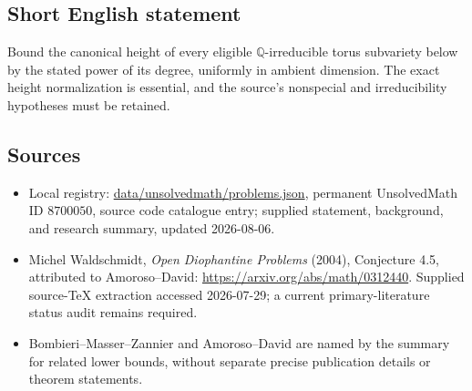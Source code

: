 \documentclass[11pt]{article}
\begin{document}
\subsection{Short English statement}
Bound the canonical height of every eligible \(\mathbb Q\)-irreducible torus subvariety below by the stated power of its degree, uniformly in ambient dimension. The exact height normalization is essential, and the source's nonspecial and irreducibility hypotheses must be retained.
\subsection{Sources}
\begin{itemize}
\item Local registry: \url{data/unsolvedmath/problems.json}, permanent UnsolvedMath ID \(8700050\), source code catalogue entry; supplied statement, background, and research summary, updated 2026-08-06.
\item Michel Waldschmidt, \emph{Open Diophantine Problems} (2004), Conjecture 4.5, attributed to Amoroso--David: \url{https://arxiv.org/abs/math/0312440}. Supplied source-TeX extraction accessed 2026-07-29; a current primary-literature status audit remains required.
\item Bombieri--Masser--Zannier and Amoroso--David are named by the summary for related lower bounds, without separate precise publication details or theorem statements.
\end{itemize}
\end{document}
